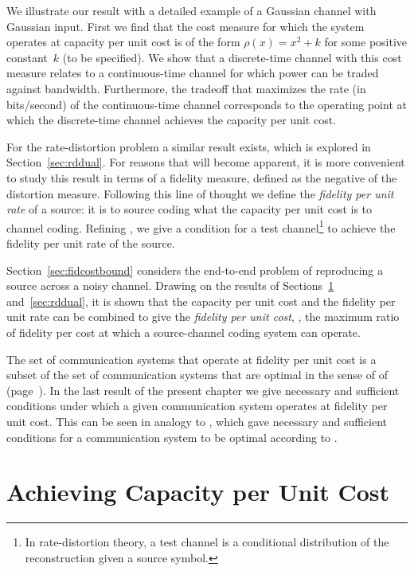 We illustrate our result with a detailed example of a Gaussian channel with
Gaussian input.  First we find that the cost measure for which the system
operates at capacity per unit cost is of the form $\rho(x) = x^2 + k$ for some
positive constant~$k$ (to be specified). We show that a discrete-time channel
with this cost measure relates to a continuous-time channel for which power can
be traded against bandwidth.  Furthermore, the tradeoff that maximizes the rate
(in bits\slash second) of the continuous-time channel corresponds to the
operating point at which the discrete-time channel achieves the capacity per
unit cost.

For the rate-distortion problem a similar result exists, which is explored in
Section~\ref{sec:rddual}. For reasons that will become apparent, it is more
convenient to study this result in terms of a fidelity measure, defined as the
negative of the distortion measure. Following this line of
thought we define the \emph{fidelity per unit rate} of a source:
it is to source coding what the capacity per unit cost is to channel coding.
Refining , we give a condition for a test
channel\footnote{In rate-distortion theory, a test channel is a conditional
distribution of the reconstruction given a source symbol.}
to achieve the fidelity per unit rate of the source. 

Section~\ref{sec:fidcostbound} considers the end-to-end problem of
reproducing a source across a noisy channel. Drawing on the results of
Sections~\ref{sec:cuc} and~\ref{sec:rddual}, it is shown that the capacity per
unit cost and the fidelity per unit rate can be combined to give the
\emph{fidelity per unit cost}, \ie, the maximum ratio of fidelity per cost at
which a source-channel coding system can operate.

The set of communication systems that operate at fidelity per unit cost is a
subset of the set of communication systems that are optimal in the sense of
 of  (page~\pageref{def:optimality}).
In the last result of the present chapter we give necessary and sufficient
conditions under which a given communication  system operates at fidelity per
unit cost. This can be seen in analogy to , which
gave necessary and sufficient conditions for a communication system to be
optimal according to .

\vfill
\section{Achieving Capacity per Unit Cost}
\label{sec:cuc}

